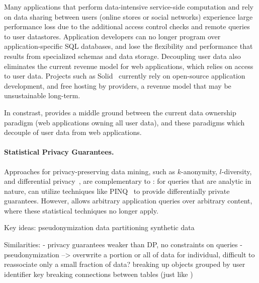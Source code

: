 Many applications that perform data-intensive service-side computation and rely on data sharing
between users (\eg online stores or social networks) experience large performance loss due to the
additional access control checks and remote queries to user datastores. Application
developers can no longer program over application-specific SQL databases, and lose the flexibility and performance that results from specialized schemas and data storage.
Decoupling user data also eliminates the current revenue model for web applications, which relies on access
to user data. Projects such as Solid~\cite{solid} currently rely on open-source application
development, and free hosting by providers, a revenue model that may be unsustainable
long-term.

In constrast, \name provides a middle ground between the current data ownership paradigm (web
applications owning all user data), and these paradigms which decouple of user data from web applications. 


\paragraph{Statistical Privacy Guarantees.}
Approaches for privacy-preserving data mining, such as $k$-anonymity, $l$-diversity, and
differential privacy~\cite{dataminingmodels}, are complementary to \sys: for queries that are
analytic in nature, \name can utilize techniques like PINQ~\cite{pinq} to provide differentially
private guarantees. However, \sys allows arbitrary application queries over arbitrary content, where
these statistical techniques no longer apply. 

\iffalse
Key ideas:
    pseudonymization 
    data partitioning
    synthetic data

Similarities:
- privacy guarantees weaker than DP, no constraints on queries
- pseudonymization --> overwrite a portion or all of data for individual, difficult to reassociate
    only a small fraction of data?
    breaking up objects grouped by user identifier key
    breaking connections between tables (just like )

